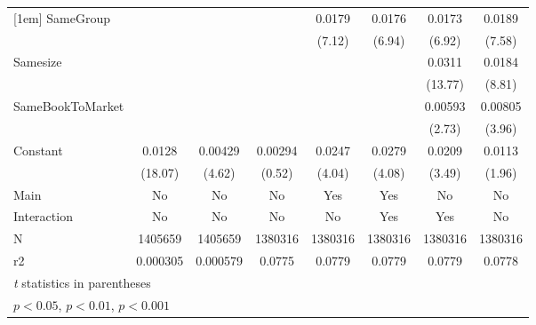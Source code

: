 {\begin{tabular}{l*{7}{c}}
[1em]
SameGroup           &                     &                     &                     &      0.0179\sym{***}&      0.0176\sym{***}&      0.0173\sym{***}&      0.0189\sym{***}\\
                    &                     &                     &                     &      (7.12)         &      (6.94)         &      (6.92)         &      (7.58)         \\
[1em]
Samesize            &                     &                     &                     &                     &                     &      0.0311\sym{***}&      0.0184\sym{***}\\
                    &                     &                     &                     &                     &                     &     (13.77)         &      (8.81)         \\
[1em]
SameBookToMarket    &                     &                     &                     &                     &                     &     0.00593\sym{**} &     0.00805\sym{***}\\
                    &                     &                     &                     &                     &                     &      (2.73)         &      (3.96)         \\
[1em]
Constant            &      0.0128\sym{***}&     0.00429\sym{***}&     0.00294         &      0.0247\sym{***}&      0.0279\sym{***}&      0.0209\sym{***}&      0.0113\sym{*}  \\
                    &     (18.07)         &      (4.62)         &      (0.52)         &      (4.04)         &      (4.08)         &      (3.49)         &      (1.96)         \\
\hline
Main                &          No         &          No         &          No         &         Yes         &         Yes         &          No         &          No         \\
Interaction         &          No         &          No         &          No         &          No         &         Yes         &         Yes         &          No         \\
N                   &     1405659         &     1405659         &     1380316         &     1380316         &     1380316         &     1380316         &     1380316         \\
r2                  &    0.000305         &    0.000579         &      0.0775         &      0.0779         &      0.0779         &      0.0779         &      0.0778         \\
\hline\hline
\multicolumn{8}{l}{\footnotesize \textit{t} statistics in parentheses}\\
\multicolumn{8}{l}{\footnotesize \sym{*} \(p<0.05\), \sym{**} \(p<0.01\), \sym{***} \(p<0.001\)}\\
\end{tabular}
}
